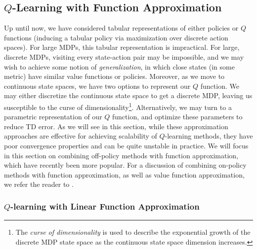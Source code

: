 \subsection{$Q$-Learning with Function Approximation}

Up until now, we have considered tabular representations of either policies or $Q$ functions (inducing a tabular policy via maximization over discrete action spaces). For large MDPs, this tabular representation is impractical. For large, discrete MDPs, visiting every state-action pair may be impossible, and we may wish to achieve some notion of \textit{generalization}, in which close states (in some metric) have similar value functions or policies. Moreover, as we move to continuous state spaces, we have two options to represent our $Q$ function. We may either discretize the continuous state space to get a discrete MDP, leaving us susceptible to the curse of dimensionality\footnote{The \textit{curse of dimensionality} is used to describe the exponential growth of the discrete MDP state space as the continuous state space dimension increases.}. Alternatively, we may turn to a parametric representation of our $Q$ function, and optimize these parameters to reduce TD error. As we will see in this section, while these approximation approaches are effective for achieving scalability of $Q$-learning methods, they have poor convergence properties and can be quite unstable in practice. We will focus in this section on combining off-policy methods with function approximation, which have recently been more popular. For a discussion of combining on-policy methods with function approximation, as well as value function approximation, we refer the reader to \cite{sutton2018reinforcement}.

\subsubsection{$Q$-learning with Linear Function Approximation}

